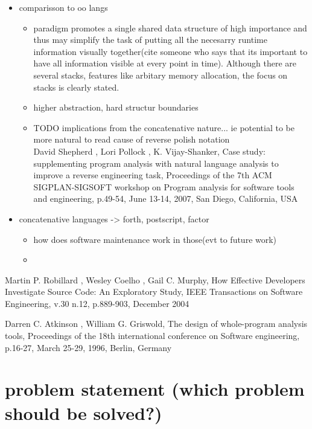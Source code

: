 \begin{itemize}
\item comparisson to oo langs
	\begin{itemize}
	\item paradigm promotes a single shared data structure of high importance and thus may simplify the task of putting all the necesarry runtime information visually together(cite someone who says that its important to have all information visible at every point in time). Although there are several stacks, features like arbitary memory allocation, the focus on stacks is clearly stated.
	\item higher abstraction, hard structur boundaries
	\end{itemize}
	\begin{itemize}
	\item TODO implications from the concatenative nature... ie potential to be more natural to read cause of reverse polish notation \\
	David Shepherd , Lori Pollock , K. Vijay-Shanker, Case study: supplementing program analysis with natural language analysis to improve a reverse engineering task, Proceedings of the 7th ACM SIGPLAN-SIGSOFT workshop on Program analysis for software tools and engineering, p.49-54, June 13-14, 2007, San Diego, California, USA
	\end{itemize}
	
\item concatenative languages -> forth, postscript, factor
	\begin{itemize}
	\item how does software maintenance work in those(evt to future work)
	\item 
	\end{itemize}
\end{itemize}

Martin P. Robillard , Wesley Coelho , Gail C. Murphy, How Effective Developers Investigate Source Code: An Exploratory Study, IEEE Transactions on Software Engineering, v.30 n.12, p.889-903, December 2004

Darren C. Atkinson , William G. Griswold, The design of whole-program analysis tools, Proceedings of the 18th international conference on Software engineering, p.16-27, March 25-29, 1996, Berlin, Germany

\section{problem statement (which problem should be solved?)}

